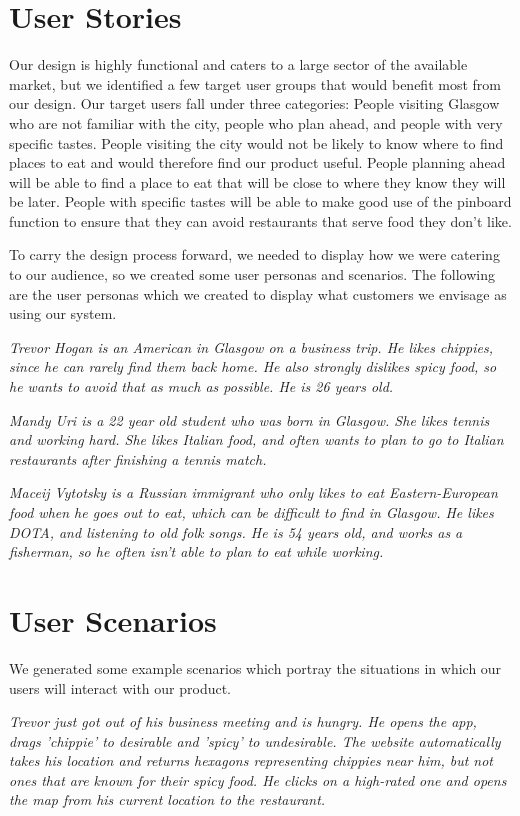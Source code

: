 \documentclass[10pt,a4paper]{article}
\begin{document}
\section*{User Stories}
Our design is highly functional and caters to a large sector of the available market, but we identified a few target user groups that would benefit most from our design. Our target users fall under three categories: People visiting Glasgow who are not familiar with the city, people who plan ahead, and people with very specific tastes. People visiting the city would not be likely to know where to find places to eat and would therefore find our product useful. People planning ahead will be able to find a place to eat that will be close to where they know they will be later. People with specific tastes will be able to make good use of the pinboard function to ensure that they can avoid restaurants that serve food they don’t like.

To carry the design process forward, we needed to display how we were catering to our audience, so we created some user personas and scenarios. The following are the user personas which we created to display what customers we envisage as using our system.


\textit{Trevor  Hogan is an American in Glasgow on a business trip. He likes chippies, since he can rarely find them back home. He also strongly dislikes spicy food, so he wants to avoid that as much as possible. He is 26 years old.}

\textit{Mandy Uri is a 22 year old student who was born in Glasgow. She likes tennis and working hard. She likes Italian food, and often wants to plan to go to Italian restaurants after finishing a tennis match.}

\textit{Maceij Vytotsky is a Russian immigrant who only likes to eat Eastern-European food when he goes out to eat, which can be difficult to find in Glasgow. He likes DOTA, and listening to old folk songs. He is 54 years old, and works as a fisherman, so he often isn't able to plan to eat while working.}

\section*{User Scenarios}

We generated some example scenarios which portray the situations in which our users will interact with our product.

\textit{Trevor just got out of his business meeting and is hungry. He opens the app, drags 'chippie' to desirable and 'spicy' to undesirable. The website automatically takes his location and returns hexagons representing chippies near him, but not ones that are known for their spicy food. He clicks on a high-rated one and opens the map from his current location to the restaurant.}
\end{document}
